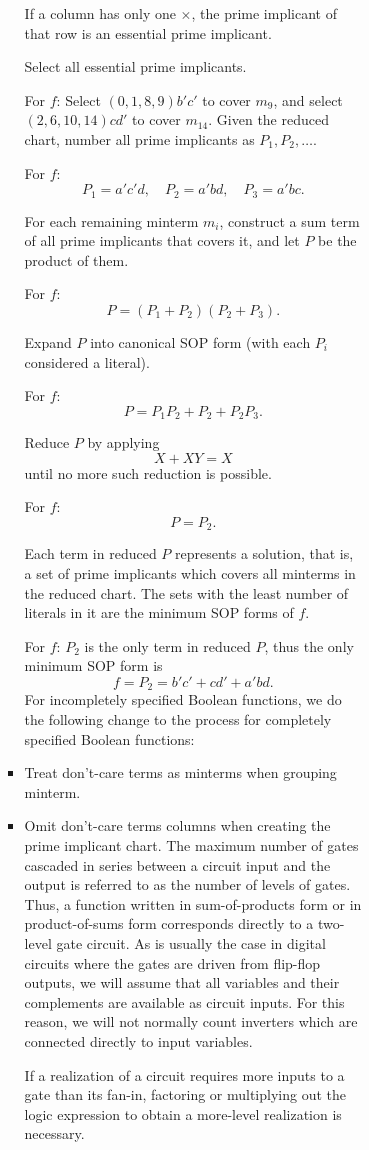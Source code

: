\documentclass[a4paper,12pt]{article}
\begin{document}
\begin{itemize}
\begin{itemize}
\begin{itemize}
\begin{itemize}
\begin{itemize}
\begin{itemize}
\begin{itemize}
If a column has only one $\times$, the prime implicant of that row is an essential prime implicant.

Select all essential prime implicants.

For $f$: Select $(0,1,8,9) b'c'$ to cover $m_9$, and select $(2,6,10,14) cd'$ to cover $m_{14}$.
Given the reduced chart, number all prime implicants as $P_1,P_2,\ldots$.

For $f$:
\[P_1=a'c'd,\quad P_2=a'bd,\quad P_3=a'bc.\]

For each remaining minterm $m_i$, construct a sum term of all prime implicants that covers it, and let $P$ be the product of them.

For $f$:
\[P=(P_1+P_2)(P_2+P_3).\]

Expand $P$ into canonical SOP form (with each $P_i$ considered a literal).

For $f$:
\[P=P_1P_2+P_2+P_2P_3.\]

Reduce $P$ by applying
\[X+XY=X\]
until no more such reduction is possible.

For $f$:
\[P=P_2.\]

Each term in reduced $P$ represents a solution, that is, a set of prime implicants which covers all minterms in the reduced chart. The sets with the least number of literals in it are the minimum SOP forms of $f$.

For $f$: $P_2$ is the only term in reduced $P$, thus the only minimum SOP form is 
\[f=P_2=b'c'+cd'+a'bd.\]
For incompletely specified Boolean functions, we do the following change to the process for completely specified Boolean functions:
\ben
\item Treat don't-care terms as minterms when grouping minterm.
\item Omit don't-care terms columns when creating the prime implicant chart.
\een
{}
The maximum number of gates cascaded in series between a circuit input and the output is referred to as the number of levels of gates. Thus, a function written in sum-of-products form or in product-of-sums form corresponds directly to a two-level gate circuit. As is usually the case in digital circuits where the gates are driven from flip-flop outputs, we will assume that all variables and their complements are available as circuit inputs. For this reason, we will not normally count inverters which are connected directly to input variables.

If a realization of a circuit requires more inputs to a gate than its fan-in, factoring or multiplying out the logic expression to obtain a more-level realization is necessary.


\end{itemize}
\end{itemize}
\end{itemize}
\end{itemize}
\end{itemize}
\end{itemize}
\end{itemize}
\end{document}
